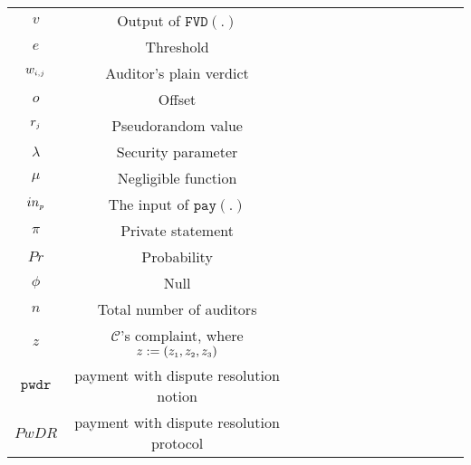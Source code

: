 \begin{table*}[!htb]
\begin{scriptsize}
\begin{center}
{{\begin{tabular}{|c|c|c|c|c|c|c|c|c|c|c|c|c|c|}
%
\cellcolor{gray!20}\scriptsize$v$ &\cellcolor{gray!20}\scriptsize  Output of $\mathtt{FVD}(.)$\\ 
%
\cellcolor{white!20}\scriptsize$e$ &\cellcolor{white!20}\scriptsize  Threshold\\ 
%            
 \cellcolor{gray!20}\scriptsize$w_{\scriptscriptstyle i,j}$ &\cellcolor{gray!20}\scriptsize  Auditor's plain verdict\\ 
%     
\cellcolor{white!20}\scriptsize$o$ &\cellcolor{white!20}\scriptsize  Offset\\  
  \cellcolor{gray!20}\scriptsize$r_{\scriptscriptstyle j}$ &\cellcolor{gray!20}\scriptsize  Pseudorandom value\\   
\cellcolor{white!20}\scriptsize$\lambda$ &\cellcolor{white!20}\scriptsize Security parameter\\  
%
\cellcolor{gray!20}\scriptsize$\mu$ &\cellcolor{gray!20}\scriptsize Negligible function\\  


\cellcolor{white!20}\scriptsize$in_{\scriptscriptstyle p}$ &\cellcolor{white!20}\scriptsize The input of $\mathtt{pay}(.)$\\                    
%
\cellcolor{gray!20}\scriptsize$\pi$ &\cellcolor{gray!20}\scriptsize Private statement\\        
  \cellcolor{white!20}\scriptsize$Pr$ &\cellcolor{white!20}\scriptsize Probability\\   

%
\cellcolor{gray!20}\scriptsize$\phi$ &\cellcolor{gray!20}\scriptsize  Null\\ 
%
\cellcolor{white!20}\scriptsize$n$ &\cellcolor{white!20}\scriptsize  Total number of auditors\\  
%           
\cellcolor{gray!20}\scriptsize$z$ &\cellcolor{gray!20}\scriptsize  $\mathcal{C}$'s complaint, where $z:=(z_{\scriptscriptstyle 1}, z_{\scriptscriptstyle 2}, z_{\scriptscriptstyle 3})$\\ 
%
\cellcolor{white!20}\scriptsize$\mathtt{pwdr}$ &\cellcolor{white!20}\scriptsize  payment with dispute resolution notion\\ 
%
\cellcolor{gray!20}\scriptsize$PwDR$ &\cellcolor{gray!20}\scriptsize  payment with dispute resolution protocol\\ 
\hline 


      

           
              
\end{tabular}\label{table:notation-table}
%
}}
\end{center}
\end{scriptsize}
\end{table*}





























